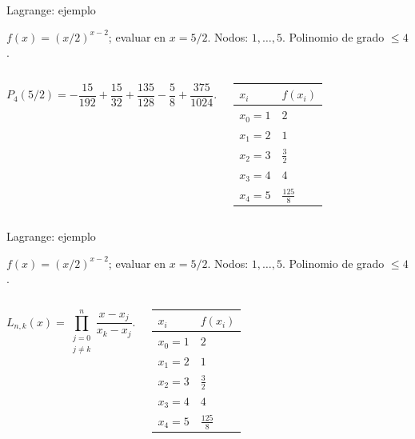 \documentclass[original_version/main.tex]{subfiles}
\begin{document}
\begin{frame}[t]{Lagrange: ejemplo}
\par\noindent\begin{minipage}[t][7.5mm][t]{\textwidth}\small\strut $f(x)=(x/2)^{x-2}$; evaluar en $x=5/2$. Nodos: $1,\ldots,5$. Polinomio de grado $\le 4$.\end{minipage}\par\nointerlineskip
\begin{columns}[T]\small\setlength{\abovedisplayskip}{4pt}\setlength{\belowdisplayskip}{4pt}\small\[P_4(5/2)=-\frac{15}{192}+\frac{15}{32}+\frac{135}{128}-\frac58+\frac{375}{1024}.\]\begingroup\small\setlength{\tabcolsep}{3pt}\begin{center}\begin{tabular}{|C{.42\textwidth}|C{.42\textwidth}|}\hline
\rule[-2mm]{0pt}{6mm}$x_i$&$f(x_i)$\\\hline
\rule[-2.5mm]{0pt}{6mm}$x_0=1$&$2$\\\hline
\rule[-2.5mm]{0pt}{6mm}$x_1=2$&$1$\\\hline
\rule[-2.5mm]{0pt}{6mm}$x_2=3$&$\frac{3}{2}$\\\hline
\rule[-2.5mm]{0pt}{6mm}$x_3=4$&$4$\\\hline
\rule[-2.5mm]{0pt}{6mm}$x_4=5$&$\frac{125}{8}$\\\hline
\end{tabular}\end{center}\endgroup\par
\end{columns}
\end{frame}
\begin{frame}[t]{Lagrange: ejemplo}
\par\noindent\begin{minipage}[t][7.5mm][t]{\textwidth}\small\strut $f(x)=(x/2)^{x-2}$; evaluar en $x=5/2$. Nodos: $1,\ldots,5$. Polinomio de grado $\le 4$.\end{minipage}\par\nointerlineskip
\begin{columns}[T]\small\setlength{\abovedisplayskip}{4pt}\setlength{\belowdisplayskip}{4pt}\[L_{n,k}(x)=\prod_{\substack{j=0\\j\ne k}}^n\frac{x-x_j}{x_k-x_j}.\]\begingroup\small\setlength{\tabcolsep}{3pt}\begin{center}\begin{tabular}{|C{.42\textwidth}|C{.42\textwidth}|}\hline
\rule[-2mm]{0pt}{6mm}$x_i$&$f(x_i)$\\\hline
\rule[-2.5mm]{0pt}{6mm}$x_0=1$&$2$\\\hline
\rule[-2.5mm]{0pt}{6mm}$x_1=2$&$1$\\\hline
\rule[-2.5mm]{0pt}{6mm}$x_2=3$&$\frac{3}{2}$\\\hline
\rule[-2.5mm]{0pt}{6mm}$x_3=4$&$4$\\\hline
\rule[-2.5mm]{0pt}{6mm}$x_4=5$&$\frac{125}{8}$\\\hline
\end{tabular}\end{center}\endgroup\par
\end{columns}
\end{frame}
\end{document}
